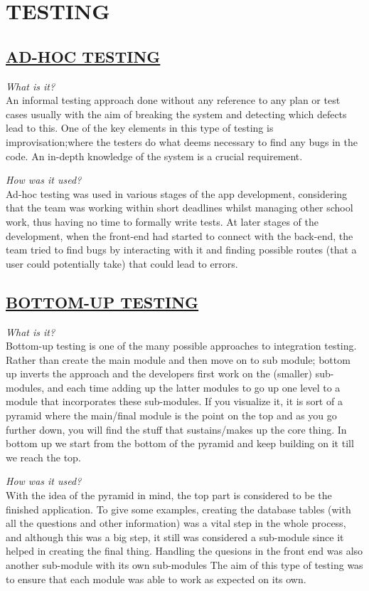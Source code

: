 \documentclass[paper=a4,fontsize=11pt]{article}
\newcommand{\sepspace}{\vspace*{1em}}		%
\newcommand{\sephalfspace}{\vspace*{0.3em}}		%
\newcommand{\MainSection}[1]{\section*{\uppercase{#1}}}
\newcommand{\SectionPart}[1]{\subsection*{\uppercase{#1}}}
\begin{document}
\newpage


\MainSection{Testing}

\SectionPart{\ul{Ad-hoc Testing}}
\textit{What is it?}\\
An informal testing approach done without any reference to any plan or test
cases usually with the aim of breaking the system and detecting which defects
lead to this. One of the key elements in this type of testing is improvisation;where the
testers do what deems necessary to find any bugs in the code. An in-depth knowledge of the
system is a crucial requirement.\\
\sephalfspace

\noindent
\textit{How was it used?}\\
Ad-hoc testing was used in various stages of the app development, considering that
the team was working within short deadlines whilst managing other school work, thus
having no time to formally write tests. At later stages of the development, when the front-end had
started to connect with the back-end, the team tried to find bugs by interacting with
it and finding possible routes (that a user could potentially take) that could lead to errors.\\
\sepspace

\SectionPart{\ul{Bottom-up Testing}}
\textit{What is it?}\\
Bottom-up testing is one of the many possible approaches to integration testing. Rather than
create the main module and then move on to sub module; bottom up inverts the approach and the developers
first work on the (smaller) sub-modules, and each time adding up the latter modules to go up one level to a
module that incorporates these sub-modules. If you visualize it, it is sort of a pyramid where the main/final
module is the point on the top and as you go further down, you will find the stuff that sustains/makes up the
core thing. In bottom up we start from the bottom of the pyramid and keep building on it till we reach the top.\\
\sephalfspace

\noindent
\textit{How was it used?}\\
With the idea of the pyramid in mind, the top part is considered to be the finished application.
To give some examples, creating the database tables (with all the questions and other information) was
a vital step in the whole process, and although this was a big step, it still was considered a sub-module since
it helped in creating the final thing. Handling the quesions in the front end was also another sub-module with its own sub-modules
The aim of this type of testing was to ensure that each module was able to work as expected on its own. \\
\sepspace
\end{document}
